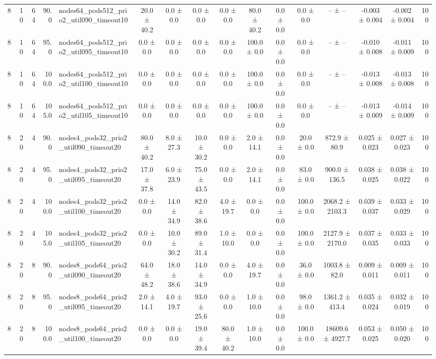 \begin{tabular}{r r r r l c c c c c c c c c c r}
8 & 10 & 64 & 90.0 & nodes64\_pods512\_prio2\_util090\_timeout10 & 20.0 ± 40.2 & 0.0 ± 0.0 & 0.0 ± 0.0 & 0.0 ± 0.0 & 80.0 ± 40.2 & 0.0 ± 0.0 & 0.0 ± 0.0 & -- ± -- & -0.003 ± 0.004 & -0.002 ± 0.004 & 100 \\
8 & 10 & 64 & 95.0 & nodes64\_pods512\_prio2\_util095\_timeout10 & 0.0 ± 0.0 & 0.0 ± 0.0 & 0.0 ± 0.0 & 0.0 ± 0.0 & 100.0 ± 0.0 & 0.0 ± 0.0 & 0.0 ± 0.0 & -- ± -- & -0.010 ± 0.008 & -0.011 ± 0.009 & 100 \\
8 & 10 & 64 & 100.0 & nodes64\_pods512\_prio2\_util100\_timeout10 & 0.0 ± 0.0 & 0.0 ± 0.0 & 0.0 ± 0.0 & 0.0 ± 0.0 & 100.0 ± 0.0 & 0.0 ± 0.0 & 0.0 ± 0.0 & -- ± -- & -0.013 ± 0.008 & -0.013 ± 0.008 & 100 \\
8 & 10 & 64 & 105.0 & nodes64\_pods512\_prio2\_util105\_timeout10 & 0.0 ± 0.0 & 0.0 ± 0.0 & 0.0 ± 0.0 & 0.0 ± 0.0 & 100.0 ± 0.0 & 0.0 ± 0.0 & 0.0 ± 0.0 & -- ± -- & -0.013 ± 0.009 & -0.014 ± 0.009 & 100 \\
8 & 20 & 4 & 90.0 & nodes4\_pods32\_prio2\_util090\_timeout20 & 80.0 ± 40.2 & 8.0 ± 27.3 & 10.0 ± 30.2 & 0.0 ± 0.0 & 2.0 ± 14.1 & 0.0 ± 0.0 & 20.0 ± 0.0 & 872.9 ± 80.9 & 0.025 ± 0.023 & 0.027 ± 0.023 & 100 \\
8 & 20 & 4 & 95.0 & nodes4\_pods32\_prio2\_util095\_timeout20 & 17.0 ± 37.8 & 6.0 ± 23.9 & 75.0 ± 43.5 & 0.0 ± 0.0 & 2.0 ± 14.1 & 0.0 ± 0.0 & 83.0 ± 0.0 & 900.0 ± 136.5 & 0.038 ± 0.025 & 0.038 ± 0.022 & 100 \\
8 & 20 & 4 & 100.0 & nodes4\_pods32\_prio2\_util100\_timeout20 & 0.0 ± 0.0 & 14.0 ± 34.9 & 82.0 ± 38.6 & 4.0 ± 19.7 & 0.0 ± 0.0 & 0.0 ± 0.0 & 100.0 ± 0.0 & 2068.2 ± 2103.3 & 0.039 ± 0.037 & 0.033 ± 0.029 & 100 \\
8 & 20 & 4 & 105.0 & nodes4\_pods32\_prio2\_util105\_timeout20 & 0.0 ± 0.0 & 10.0 ± 30.2 & 89.0 ± 31.4 & 1.0 ± 10.0 & 0.0 ± 0.0 & 0.0 ± 0.0 & 100.0 ± 0.0 & 2127.9 ± 2170.0 & 0.037 ± 0.035 & 0.033 ± 0.033 & 100 \\
8 & 20 & 8 & 90.0 & nodes8\_pods64\_prio2\_util090\_timeout20 & 64.0 ± 48.2 & 18.0 ± 38.6 & 14.0 ± 34.9 & 0.0 ± 0.0 & 4.0 ± 19.7 & 0.0 ± 0.0 & 36.0 ± 0.0 & 1003.8 ± 82.0 & 0.009 ± 0.011 & 0.009 ± 0.011 & 100 \\
8 & 20 & 8 & 95.0 & nodes8\_pods64\_prio2\_util095\_timeout20 & 2.0 ± 14.1 & 4.0 ± 19.7 & 93.0 ± 25.6 & 0.0 ± 0.0 & 1.0 ± 10.0 & 0.0 ± 0.0 & 98.0 ± 0.0 & 1361.2 ± 413.4 & 0.035 ± 0.024 & 0.032 ± 0.019 & 100 \\
8 & 20 & 8 & 100.0 & nodes8\_pods64\_prio2\_util100\_timeout20 & 0.0 ± 0.0 & 0.0 ± 0.0 & 19.0 ± 39.4 & 80.0 ± 40.2 & 1.0 ± 10.0 & 0.0 ± 0.0 & 100.0 ± 0.0 & 18609.6 ± 4927.7 & 0.053 ± 0.025 & 0.050 ± 0.020 & 100 \\

\end{tabular}
